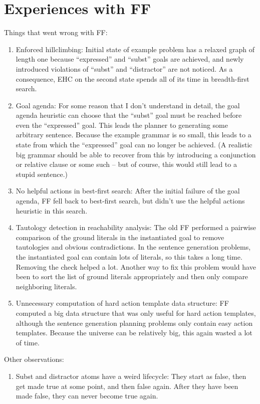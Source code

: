 \section{Experiences with FF}
\label{sec:crisp-ff}


Things that went wrong with FF:

\begin{enumerate}
\item Enforced hillclimbing: Initial state of example problem has a
  relaxed graph of length one because ``expressed'' and ``subst''
  goals are achieved, and newly introduced violations of ``subst'' and
  ``distractor'' are not noticed. As a consequence, EHC on the second
  state spends all of its time in breadth-first search.
\item Goal agenda: For some reason that I don't understand in detail,
  the goal agenda heuristic can choose that the ``subst'' goal must be
  reached before even the ``expressed'' goal. This leads the planner
  to generating some arbitrary sentence. Because the example grammar
  is so small, this leads to a state from which the ``expressed'' goal
  can no longer be achieved. (A realistic big grammar should be able
  to recover from this by introducing a conjunction or relative clause
  or some such -- but of course, this would still lead to a stupid
  sentence.)
\item No helpful actions in best-first search: After the initial
  failure of the goal agenda, FF fell back to best-first search, but
  didn't use the helpful actions heuristic in this search.
\item Tautology detection in reachability analysis: The old FF
  performed a pairwise comparison of the ground literals in the
  instantiated goal to remove tautologies and obvious contradictions.
  In the sentence generation problems, the instantiated goal can
  contain lots of literals, so this takes a long time.  Removing the
  check helped a lot.  Another way to fix this problem would have been
  to sort the list of ground literals appropriately and then only
  compare neighboring literals.
\item Unnecessary computation of hard action template data structure:
  FF computed a big data structure that was only useful for hard
  action templates, although the sentence generation planning problems
  only contain easy action templates.  Because the universe can be
  relatively big, this again wasted a lot of time.
\end{enumerate}


Other observations:

\begin{enumerate}
\item Subst and distractor atoms have a weird lifecycle: They start as
  false, then get made true at some point, and then false again.
  After they have been made false, they can never become true again.
\end{enumerate}

